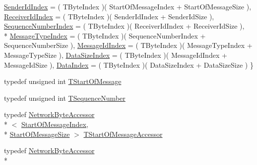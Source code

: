 \begin{DoxyCompactItemize}
\hyperlink{class_terra_swarm_1_1_message_header_a2a96f83a96cfee0465da982814cb372aa468f5b005cd4374790f76469c53b6708}{Sender\-Id\-Index} = ( T\-Byte\-Index )( Start\-Of\-Message\-Index + Start\-Of\-Message\-Size ), 
\hyperlink{class_terra_swarm_1_1_message_header_a2a96f83a96cfee0465da982814cb372aabe5cfb032e70c35d03586a7d16d66490}{Receiver\-Id\-Index} = ( T\-Byte\-Index )( Sender\-Id\-Index + Sender\-Id\-Size ), 
\hyperlink{class_terra_swarm_1_1_message_header_a2a96f83a96cfee0465da982814cb372aa56286e86c6b2fb61f58f34c4fed8c28e}{Sequence\-Number\-Index} = ( T\-Byte\-Index )( Receiver\-Id\-Index + Receiver\-Id\-Size ), 
\\*
\hyperlink{class_terra_swarm_1_1_message_header_a2a96f83a96cfee0465da982814cb372aa636e016fbe208240bd9d92af77fd747a}{Message\-Type\-Index} = ( T\-Byte\-Index )( Sequence\-Number\-Index + Sequence\-Number\-Size ), 
\hyperlink{class_terra_swarm_1_1_message_header_a2a96f83a96cfee0465da982814cb372aa683b7a06a5ebe8befe0dcae6701c3003}{Message\-Id\-Index} = ( T\-Byte\-Index )( Message\-Type\-Index + Message\-Type\-Size ), 
\hyperlink{class_terra_swarm_1_1_message_header_a2a96f83a96cfee0465da982814cb372aa8bf63201f7bd66a6757cefa82db24548}{Data\-Size\-Index} = ( T\-Byte\-Index )( Message\-Id\-Index + Message\-Id\-Size ), 
\hyperlink{class_terra_swarm_1_1_message_header_a2a96f83a96cfee0465da982814cb372aa0306ff2262dbf1c9df9328c28c2adc8d}{Data\-Index} = ( T\-Byte\-Index )( Data\-Size\-Index + Data\-Size\-Size )
 \}
\item 
typedef unsigned int \hyperlink{class_terra_swarm_1_1_message_header_a2cf24e4a2eb361223ae61052630dfe24}{T\-Start\-Of\-Message}
\item 
typedef unsigned int \hyperlink{class_terra_swarm_1_1_message_header_a0d92af0bc15cc856a21975d1f3813eb5}{T\-Sequence\-Number}
\item 
typedef \hyperlink{class_terra_swarm_1_1_network_byte_accessor}{Network\-Byte\-Accessor}\\*
$<$ \hyperlink{class_terra_swarm_1_1_message_header_a2a96f83a96cfee0465da982814cb372aa74b66ff4fa355a80faf96e67ce47f679}{Start\-Of\-Message\-Index}, \\*
\hyperlink{class_terra_swarm_1_1_message_header_a189acad5bd9f60fe47b3381da62d3484a66c01670e26436cba7028bb19c238cef}{Start\-Of\-Message\-Size} $>$ \hyperlink{class_terra_swarm_1_1_message_header_a791ee152a9a2709c7479737dfdddfa2f}{T\-Start\-Of\-Message\-Accessor}
\item 
typedef \hyperlink{class_terra_swarm_1_1_network_byte_accessor}{Network\-Byte\-Accessor}\\*

\end{DoxyCompactItemize}
